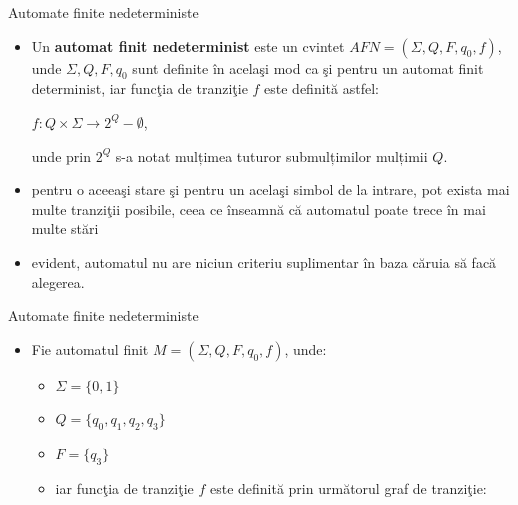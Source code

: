 \documentclass[pdf]{beamer}
\begin{document}
\begin{frame}{Automate finite nedeterministe}
\begin{itemize}
\item
Un \textbf{automat finit nedeterminist} este un cvintet $AFN=(\Sigma, Q, F, q_{0}, f)$, unde $\Sigma, Q, F, q_{0}$ sunt definite în acelaşi mod ca şi pentru un automat finit determinist, iar funcţia de tranziţie $f$ este definită astfel:

$f:Q \times \Sigma \rightarrow 2^{Q} - \emptyset$,

unde prin $2^{Q}$ s-a notat mulțimea tuturor submulțimilor mulțimii $Q$.
\item
pentru o aceeaşi stare şi pentru un acelaşi simbol de la intrare, pot exista mai multe tranziţii posibile, ceea ce înseamnă că automatul poate trece în mai multe stări
\item
evident, automatul nu are niciun criteriu suplimentar în baza căruia să facă alegerea.
\end{itemize}
\end{frame}



\begin{frame}{Automate finite nedeterministe}
\begin{itemize}
\item
Fie automatul finit $M=(\Sigma, Q, F, q_{0}, f)$, unde:
\begin{itemize}
\item
$\Sigma=\{ 0, 1 \}$
\item
$Q=\{ q_{0}, q_{1}, q_{2}, q_{3} \}$
\item
$F=\{ q_{3} \}$
\item
iar funcţia de tranziţie $f$ este definită prin următorul graf de tranziţie:
\end{itemize}

\begin{figure}[H]
\centering
{}
\end{figure}
\end{itemize}
\end{frame}
\end{document}
